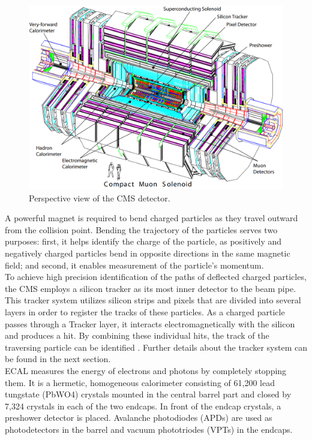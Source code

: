 \begin{center}
  \begin{figure}[ht]
    \centering
    \includegraphics[scale=.3]{Chapter2/CMS_detector_simple.png}
    \caption[Perspective view of the CMS detector]{Perspective view of the CMS detector.}
    \label{detector_CMS}
  \end{figure}
\end{center}

A powerful magnet is required to bend charged particles as they travel outward from the collision point. Bending the trajectory of the particles serves two purposes: first, it helps identify the charge of the particle, as positively and negatively charged particles bend in opposite directions in the same magnetic field; and second, it enables measurement of the particle's momentum.\\

To achieve high precision identification of the paths of deflected charged particles, the CMS employs a silicon tracker as its most inner detector to the beam pipe. This tracker system utilizes silicon strips and pixels that are divided into several layers in order to register the tracks of these particles. As a charged particle passes through a Tracker layer, it interacts electromagnetically with the silicon and produces a hit. By combining these individual hits, the track of the traversing particle can be identified \cite{CMS_Exp_2008}. Further details about the tracker system can be found in the next section.\\

ECAL measures the energy of electrons and photons by completely stopping them. It is a hermetic, homogeneous calorimeter consisting of 61,200 lead tungstate (PbWO4) crystals mounted in the central barrel part and closed by 7,324 crystals in each of the two endcaps. In front of the endcap crystals, a preshower detector is placed. Avalanche photodiodes (APDs) are used as photodetectors in the barrel and vacuum phototriodes (VPTs) in the endcaps.\\ 

